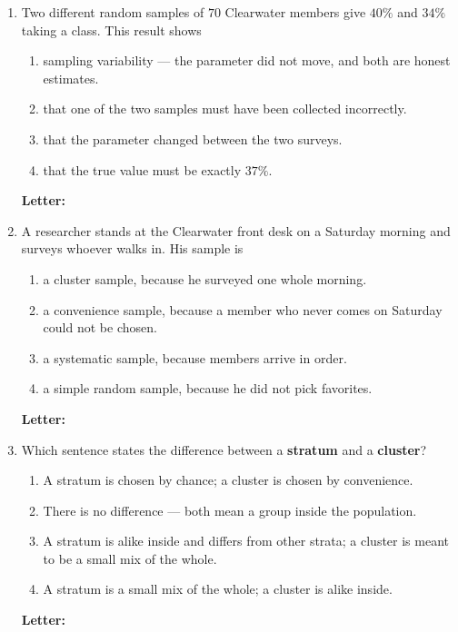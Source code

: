 \documentclass[10pt]{article}
\begin{document}
\begin{enumerate}[leftmargin=2.2em, itemsep=5pt, topsep=2pt, start=9]
\item Two different random samples of $70$ Clearwater members give $40\%$ and $34\%$ taking a
class. This result shows
\begin{enumerate}[label=(\Alph*), leftmargin=1.8em, itemsep=1pt, topsep=1pt]
  \item sampling variability --- the parameter did not move, and both are honest estimates.
  \item that one of the two samples must have been collected incorrectly.
  \item that the parameter changed between the two surveys.
  \item that the true value must be exactly $37\%$.
\end{enumerate}
\hfill \textbf{Letter:} \gradedblank[id=q12, type=choice, points=2, answer={A}]{0.9cm}{11pt}

\item A researcher stands at the Clearwater front desk on a Saturday morning and surveys
whoever walks in. His sample is
\begin{enumerate}[label=(\Alph*), leftmargin=1.8em, itemsep=1pt, topsep=1pt]
  \item a cluster sample, because he surveyed one whole morning.
  \item a convenience sample, because a member who never comes on Saturday could not be chosen.
  \item a systematic sample, because members arrive in order.
  \item a simple random sample, because he did not pick favorites.
\end{enumerate}
\hfill \textbf{Letter:} \gradedblank[id=q13, type=choice, points=2, answer={B}]{0.9cm}{11pt}

\item Which sentence states the difference between a \textbf{stratum} and a \textbf{cluster}?
\begin{enumerate}[label=(\Alph*), leftmargin=1.8em, itemsep=1pt, topsep=1pt]
  \item A stratum is chosen by chance; a cluster is chosen by convenience.
  \item There is no difference --- both mean a group inside the population.
  \item A stratum is alike inside and differs from other strata; a cluster is meant to be a
        small mix of the whole.
  \item A stratum is a small mix of the whole; a cluster is alike inside.
\end{enumerate}
\hfill \textbf{Letter:} \gradedblank[id=q14, type=choice, points=2, answer={C}]{0.9cm}{11pt}

\end{enumerate}
\normalsize
\end{document}
